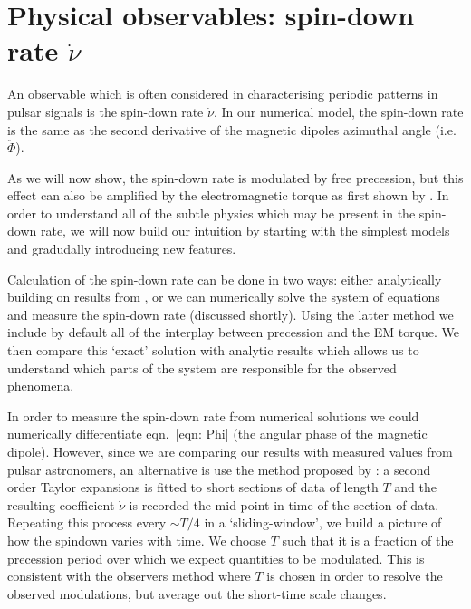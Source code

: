 \documentclass[/home/greg/Thesis/main/main.tex]{subfiles}
\begin{document}
\graphicspath{{/home/greg/Neutron_star_modelling/SpindownRate/img/}}

\newcommand{\spindown}{\dot{\nu}}
\newcommand{\Aem}{\mathcal{A}_{\mathrm{EM}}}
\section{Physical observables: spin-down rate $\spindown$}

An observable which is often considered in characterising periodic patterns in
pulsar signals is the spin-down rate $\spindown$. In our numerical model, the
spin-down rate is the same as the second derivative of the magnetic dipoles 
azimuthal angle (i.e. $\ddot{\Phi}$). 

As we will now show, the spin-down rate is modulated by free precession, but
this effect can also be amplified by the electromagnetic torque as first shown
by \citet{Jones2004}. In order to understand all of the subtle physics which
may be present in the spin-down rate, we will now build our intuition by starting
with the simplest models and gradudally introducing new features. 

Calculation of the spin-down rate can be done in two ways: either analytically
building on results from \citet{Jones2004}, or we can numerically solve the
system of equations and measure the spin-down rate (discussed shortly). Using the
latter method we include by default all of the interplay between precession and
the EM torque. We then compare this `exact' solution with analytic results
which allows us to understand which parts of the system are responsible for the
observed phenomena. 

In order to measure the spin-down rate from numerical solutions we could
numerically differentiate eqn.~\eqref{eqn: Phi} (the angular phase of the
magnetic dipole). However, since we are comparing our results with measured
values from pulsar astronomers, an alternative is use the method proposed by
\citet{Lyne2010}: a second order Taylor expansions is fitted to short sections
of data of length $T$ and the resulting coefficient $\spindown$ is recorded the
mid-point in time of the section of data. Repeating this process every $\sim
T/4$ in a `sliding-window', we build a picture of how the spindown varies with time.
We choose $T$ such that it is a fraction of the precession period over which we
expect quantities to be modulated. This is consistent with the observers method
where $T$ is chosen in order to resolve the observed modulations, but average
out the short-time scale changes.
\end{document}
